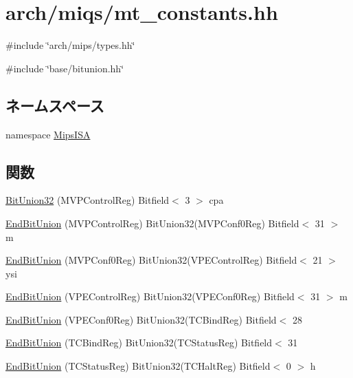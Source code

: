 \hypertarget{miqs_2mt__constants_8hh}{
\section{arch/miqs/mt\_\-constants.hh}
\label{miqs_2mt__constants_8hh}
}
{\ttfamily \#include \char`\"{}arch/mips/types.hh\char`\"{}}\par
{\ttfamily \#include \char`\"{}base/bitunion.hh\char`\"{}}\par
\subsection*{ネームスペース}
\begin{DoxyCompactItemize}
\item 
namespace \hyperlink{namespaceMipsISA}{MipsISA}
\end{DoxyCompactItemize}
\subsection*{関数}
\begin{DoxyCompactItemize}
\item 
\hyperlink{namespaceMipsISA_a9c38a1dd425d938646c1e57e919ee830}{BitUnion32} (MVPControlReg) Bitfield$<$ 3 $>$ cpa
\item 
\hyperlink{namespaceMipsISA_ad4fdd9ff9306f98fd1cb2811a1ee108f}{EndBitUnion} (MVPControlReg) BitUnion32(MVPConf0Reg) Bitfield$<$ 31 $>$ m
\item 
\hyperlink{namespaceMipsISA_aeff4cebcd774805b052a6d3eaae89d36}{EndBitUnion} (MVPConf0Reg) BitUnion32(VPEControlReg) Bitfield$<$ 21 $>$ ysi
\item 
\hyperlink{namespaceMipsISA_a87885d433cae4e0f9f50680dd02bd7df}{EndBitUnion} (VPEControlReg) BitUnion32(VPEConf0Reg) Bitfield$<$ 31 $>$ m
\item 
\hyperlink{namespaceMipsISA_acdeb651bae709ddc62e0641544f676e8}{EndBitUnion} (VPEConf0Reg) BitUnion32(TCBindReg) Bitfield$<$ 28
\item 
\hyperlink{namespaceMipsISA_a1c829af5069f0e961b7356026c2f45db}{EndBitUnion} (TCBindReg) BitUnion32(TCStatusReg) Bitfield$<$ 31
\item 
\hyperlink{namespaceMipsISA_a6d539c3ccb9c2c4a1092d245f21830ad}{EndBitUnion} (TCStatusReg) BitUnion32(TCHaltReg) Bitfield$<$ 0 $>$ h
\end{DoxyCompactItemize}
